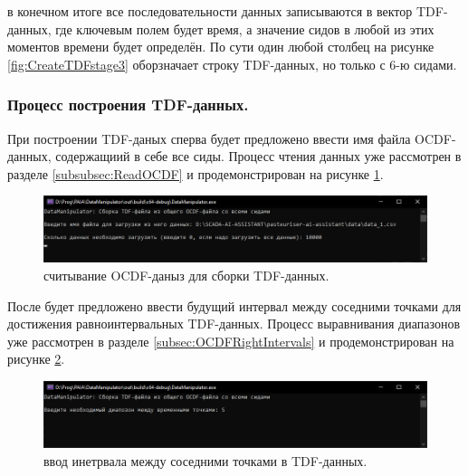 {  \par в конечном итоге все последовательности данных записываются в вектор TDF-данных, где ключевым полем будет время, а значение сидов в любой из этих моментов времени будет определён. По сути один любой столбец на рисунке \ref{fig:CreateTDFstage3} оборзначает строку TDF-данных, но только с 6-ю сидами. 

}

\subsubsection{ \standartTitleFont
  Процесс построения TDF-данных.
} \label{subsubsec:CreateTDFProc}

{\standartFont

  \par При построении TDF-даных сперва будет предложено ввести имя файла OCDF-данных, содержащиий в себе все сиды. Процесс чтения данных уже рассмотрен в разделе \ref{subsubsec:ReadOCDF} и продемонстрирован на рисунке \ref{fig:CreateTDFReadData}. 

  \begin{figure}[H]
    \centering
    \includegraphics[width=\textwidth]{images/forDataManipulator/CreateTDFReadData.png}
    \caption{считывание OCDF-даныз для сборки TDF-данных.} 
    \label{fig:CreateTDFReadData}
  \end{figure}

  \par После будет предложено ввести будущий интервал между соседними точками для достижения равноинтервальных TDF-данных. Процесс выравнивания диапазонов уже рассмотрен в разделе \ref{subsec:OCDFRightIntervals} и продемонстрирован на рисунке \ref{fig:CreateTDFRI}.

  \begin{figure}[H]
    \centering
    \includegraphics[width=\textwidth]{images/forDataManipulator/CreateTDFRI.png}
    \caption{ввод инетрвала между соседними точками в TDF-данных.} 
    \label{fig:CreateTDFRI}
  \end{figure}

}
